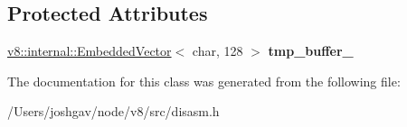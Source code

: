 \subsection*{Protected Attributes}
\begin{DoxyCompactItemize}
\item 
\hyperlink{classv8_1_1internal_1_1_embedded_vector}{v8\+::internal\+::\+Embedded\+Vector}$<$ char, 128 $>$ {\bfseries tmp\+\_\+buffer\+\_\+}\hypertarget{classdisasm_1_1_name_converter_a5badefd2fdf514300cea532e79721915}{}\label{classdisasm_1_1_name_converter_a5badefd2fdf514300cea532e79721915}

\end{DoxyCompactItemize}


The documentation for this class was generated from the following file\+:\begin{DoxyCompactItemize}
\item 
/\+Users/joshgav/node/v8/src/disasm.\+h\end{DoxyCompactItemize}
